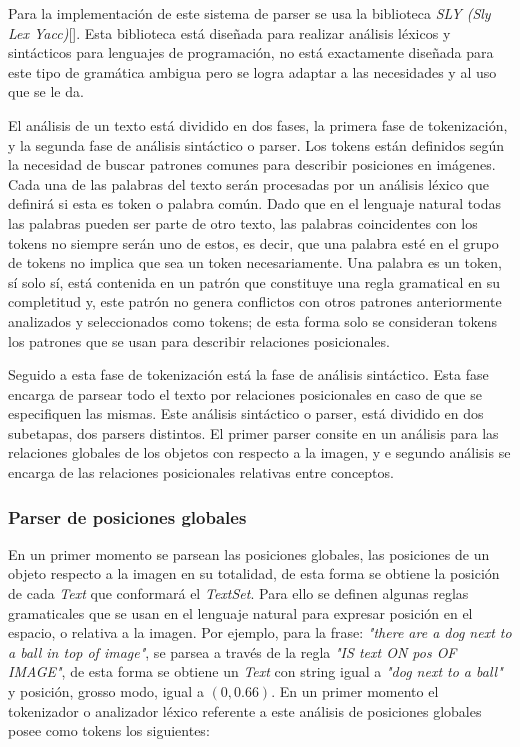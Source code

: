 Para la implementación de este sistema de parser se usa la biblioteca \textit{SLY (Sly Lex Yacc)}[\cite{sly}]. Esta biblioteca está diseñada para realizar análisis léxicos y sintácticos para lenguajes de programación, no está exactamente diseñada para este tipo de gramática ambigua pero se logra adaptar a las necesidades y al uso que se le da.

El análisis de un texto está dividido en dos fases, la primera fase de tokenización, y la segunda fase de análisis sintáctico o parser. Los tokens están definidos según la necesidad de buscar patrones comunes para describir posiciones en imágenes. Cada una de las palabras del texto serán procesadas por un análisis léxico que definirá si esta es token o palabra común. Dado que en el lenguaje natural todas las palabras pueden ser parte de otro texto, las palabras coincidentes con los tokens no siempre serán uno de estos, es decir, que una palabra esté en el grupo de tokens no implica que sea un token necesariamente. Una palabra es un token, s\'i solo s\'i, está contenida en un patrón que constituye una regla gramatical en su completitud y, este patr\'on no genera conflictos con otros patrones anteriormente analizados y seleccionados como tokens; de esta forma solo se consideran tokens los patrones que se usan para describir relaciones posicionales. 

Seguido a esta fase de tokenización est\'a la fase de análisis sintáctico. Esta fase encarga de parsear todo el texto por relaciones posicionales en caso de que se especifiquen las mismas. Este análisis sint\'actico o parser, está dividido en dos subetapas, dos parsers distintos. El primer parser consite en un análisis para las relaciones globales de los objetos con respecto a la imagen, y e segundo análisis se encarga de las relaciones posicionales relativas entre conceptos.

\subsubsection{Parser de posiciones globales}

En un primer momento se parsean las posiciones globales, las posiciones de un objeto respecto a la imagen en su totalidad, de esta forma se obtiene la posición de cada \textit{Text} que conformará el \textit{TextSet}. Para ello se definen algunas reglas gramaticales que se usan en el lenguaje natural para expresar posición en el espacio, o relativa a la imagen. Por ejemplo, para la frase: \textit{"there are a dog next to a ball in top of image"}, se parsea a través de la regla \textit{"IS text ON pos OF IMAGE"}, de esta forma se obtiene un \textit{Text} con string igual a \textit{"dog next to a ball"} y posici\'on, grosso modo, igual a $(0, 0.66)$. En un primer momento el tokenizador o analizador léxico referente a este análisis de posiciones globales posee como tokens los siguientes:

